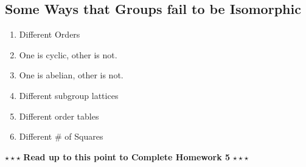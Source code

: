 \subsection*{Some Ways that Groups fail to be Isomorphic}
\begin{enumerate}
    \item Different Orders
    \item One is cyclic, other is not.
    \item One is abelian, other is not.
    \item Different subgroup lattices
    \item Different order tables
    \item Different \# of Squares
\end{enumerate}
\begin{tcolorbox}
    \begin{center}
        $\star\star\star$ \textbf{Read up to this point to Complete Homework 5} $\star\star\star$
    \end{center}
    \end{tcolorbox}
\newpage
\setcounter{dummy}{0}
